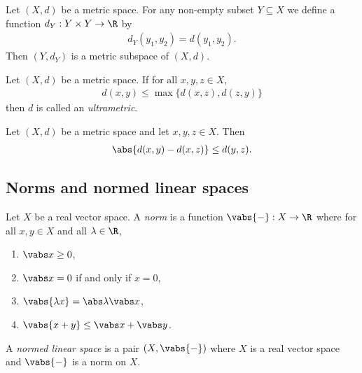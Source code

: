 \documentclass{article}
\begin{document}
\begin{definition}
    Let $(X,d)$ be a metric space. For any non-empty subset $Y\subseteq X$ we define
    a function $d_Y:Y\times Y\to\R$ by
    \begin{align*}
        d_Y(y_1,y_2)=d(y_1,y_2).
    \end{align*}
    Then $(Y,d_Y)$ is a metric subspace of $(X,d)$.
\end{definition}

\begin{definition}[Ultrametric]
    Let $(X,d)$ be a metric space. If for all $x,y,z\in X$,
    \begin{align*}
        d(x,y)\leq \max\{d(x,z),d(z,y)\}
    \end{align*}
    then $d$ is called an \emph{ultrametric}.
\end{definition}

\begin{proposition}
    Let $(X,d)$ be a metric space and let $x,y,z\in X$. Then
    \begin{align*}
        \abs{d(x,y)-d(x,z)}\leq d(y,z).
    \end{align*}
\end{proposition}

\subsection{Norms and normed linear spaces}

\begin{definition}
    Let $X$ be a real vector space. A \emph{norm} is a function $\vabs{-}:X\to\R$
    where for all $x,y\in X$ and all $\lambda\in\R$,
    \begin{enumerate}
        \item $\vabs x \geq 0$,
        \item $\vabs x = 0$ if and only if $x = 0$,
        \item $\vabs{\lambda x}=\abs \lambda \vabs x$,
        \item $\vabs{x+y}\leq \vabs x +\vabs y$.
    \end{enumerate}
    A \emph{normed linear space} is a pair $(X,\vabs{-})$ where $X$ is a real vector
    space and $\vabs{-}$ is a norm on $X$.
\end{definition}
\end{document}
